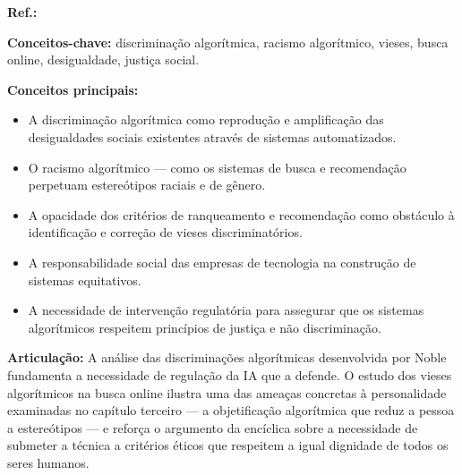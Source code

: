 \begin{fichamento}
    \textbf{Ref.:} \cite{Noble2018AFS}
    
    \textbf{Conceitos-chave:} discriminação algorítmica, racismo algorítmico, vieses, busca online, desigualdade, justiça social.
    
    \textbf{Conceitos principais:}
    \begin{itemize}
        \item A discriminação algorítmica como reprodução e amplificação das desigualdades sociais existentes através de sistemas automatizados.
        \item O racismo algorítmico — como os sistemas de busca e recomendação perpetuam estereótipos raciais e de gênero.
        \item A opacidade dos critérios de ranqueamento e recomendação como obstáculo à identificação e correção de vieses discriminatórios.
        \item A responsabilidade social das empresas de tecnologia na construção de sistemas equitativos.
        \item A necessidade de intervenção regulatória para assegurar que os sistemas algorítmicos respeitem princípios de justiça e não discriminação.
    \end{itemize}
    
    \textbf{Articulação:} A análise das discriminações algorítmicas desenvolvida por Noble fundamenta a necessidade de regulação da IA que a \MH{} defende. O estudo dos vieses algorítmicos na busca online ilustra uma das ameaças concretas à personalidade examinadas no capítulo terceiro — a objetificação algorítmica que reduz a pessoa a estereótipos — e reforça o argumento da encíclica sobre a necessidade de submeter a técnica a critérios éticos que respeitem a igual dignidade de todos os seres humanos.
\end{fichamento}

